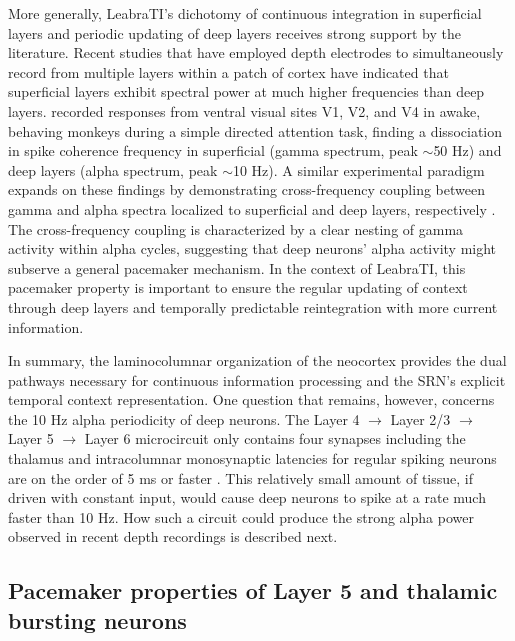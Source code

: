 \documentclass[dwyatte_dissertation.tex]{subfiles}
\begin{document}
More generally, LeabraTI's dichotomy of continuous integration in superficial layers and periodic updating of deep layers receives strong support by the literature. Recent studies that have employed depth electrodes to simultaneously record from multiple layers within a patch of cortex have indicated that superficial layers exhibit spectral power at much higher frequencies than deep layers.  recorded responses from ventral visual sites V1, V2, and V4 in awake, behaving monkeys during a simple directed attention task, finding a dissociation in spike coherence frequency in superficial (gamma spectrum, peak $\sim$50 Hz) and deep layers (alpha spectrum, peak $\sim$10 Hz). A similar experimental paradigm expands on these findings by demonstrating cross-frequency coupling between gamma and alpha spectra localized to superficial and deep layers, respectively \cite{SpaakBonnefondMaierEtAl12}. %
The cross-frequency coupling is characterized by a clear nesting of gamma activity within alpha cycles, suggesting that deep neurons' alpha activity might subserve a general pacemaker mechanism. In the context of LeabraTI, this pacemaker property is important to ensure the regular updating of context through deep layers and temporally predictable reintegration with more current information.

In summary, the laminocolumnar organization of the neocortex provides the dual pathways necessary for continuous information processing and the SRN's explicit temporal context representation. One question that remains, however, concerns the 10 Hz alpha periodicity of deep neurons. The Layer 4 $\rightarrow$ Layer 2/3 $\rightarrow$ Layer 5 $\rightarrow$ Layer 6 microcircuit only contains four synapses including the thalamus and intracolumnar monosynaptic latencies for regular spiking neurons are on the order of 5 ms or faster \cite{Armstrong-JamesFoxDas-Gupta92,LumerEdelmanTononi97}. This relatively small amount of tissue, if driven with constant input, would cause deep neurons to spike at a rate much faster than 10 Hz. How such a circuit could produce the strong alpha power observed in recent depth recordings is described next.


\subsection{Pacemaker properties of Layer 5 and thalamic bursting neurons} %
\end{document}
